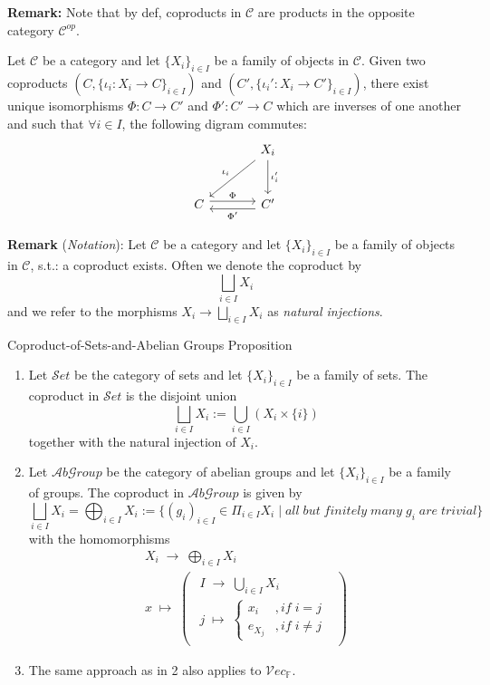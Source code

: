 \noindent\textbf{Remark:} Note that by def, coproducts in $\mathcal{C}$ are products in the opposite category $\mathcal{C}^{op}$.

\begin{proposition}
    Let $\mathcal{C}$ be a category and let $\{ X_i \}_{i \in I}$ be a family of objects in $\mathcal{C}$. Given two coproducts $(C,\{ \iota_i: X_i \to C\}_{i \in I})$ and $(C',\{ \iota_i': X_i \to C'\}_{i \in I})$, there exist unique isomorphisms $\Phi: C \to C'$ and $\Phi': C' \to C$ which are inverses of one another and such that $\forall i \in I$, the following digram commutes:
    $$\begin{tikzcd}[row sep=large, column sep=large]
        & X_i \arrow[dl, "\iota_i"'] \arrow[d, "\iota_i'"]\\
        C \arrow[r, shift left=0.7ex, "\Phi"] &  C' \arrow[l, shift left=0.7ex, "\Phi'"] 
    \end{tikzcd}$$
\end{proposition}

\noindent\textbf{Remark} (\textit{Notation}): Let $\mathcal{C}$ be a category and let $\{X_i\}_{i \in I}$ be a family of objects in $\mathcal{C}$, s.t.: a coproduct exists. Often we denote the coproduct by
$$\bigsqcup_{i \in I} X_i$$
and we refer to the morphisms $X_i \to \bigsqcup_{i \in I} X_i$ as \textit{natural injections}.

\begin{proposition}{Coproduct-of-Sets-and-Abelian Groups Proposition}\\
\begin{enumerate}
    \item Let $\mathcal{S}et$ be the category of sets and let $\{X_i\}_{i \in I}$ be a family of sets. The coproduct in $\mathcal{S}et$ is the disjoint union
    $$\bigsqcup_{i \in I} X_i := \bigcup_{i \in I} (X_i \times \{i\})$$
    together with the natural injection of $X_i$.

    \item Let $\mathcal{A}b\mathcal{G}roup$ be the category of abelian groups and let $\{X_i\}_{i \in I}$ be a family of groups. The coproduct in $\mathcal{A}b\mathcal{G}roup$ is given by 
    $$\bigsqcup_{i \in I}X_i = \bigoplus_{i \in I} X_i:= \{ (g_i)_{i \in I} \in \Pi_{i \in I} X_i \mid all\;but\; finitely\; many\; g_i\; are\;trivial\}$$
    with the homomorphisms 
    $$\substack{X_i \; \to \; \bigoplus_{i \in I} X_i\\
    x \;\mapsto\; \begin{pmatrix}
        \substack{I \;\to\; \bigcup_{i \in I}X_i\\
        j\;\mapsto\; \begin{cases}
            x_i &,if\;i=j\\
            e_{X_j} &,if\;i\neq j
        \end{cases} }
    \end{pmatrix} }$$

    \item The same approach as in 2 also applies to $\mathcal{V}ec_\mathbb{F}$.
\end{enumerate}
\end{proposition}

